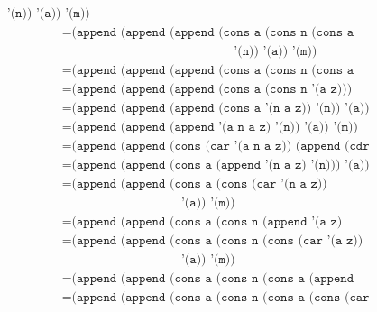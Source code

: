 \documentclass[letterpaper,11pt]{article}
\begin{document}
\begin{enumerate}
\begin{enumerate}
\begin{align*}
            \; \; \; \; \; \; \; \; \; \; \; \; \; \; \; \; \; \; \; \; \; \; \;
            \; \; \; 
                                               \texttt{'(n)) '(a)) '(m))} \\
            &= \texttt{(append (append (append (cons a (cons n (cons a (append '() '(z)))))} \\
            & \; \; \; \; \; \; \; \; \; \; \; \; \; \; \; \; \; \; \; \; \; \; \;
            \; \; \; \; \; \; \; \; \; \; \; \; \; \; \; \; \; \; \; \; \; \; \;
            \; \; \; 
                                               \texttt{'(n)) '(a)) '(m))} \\
            &= \texttt{(append (append (append (cons a (cons n (cons a '(z)))) '(n)) '(a)) '(m))} \\
            &= \texttt{(append (append (append (cons a (cons n '(a z))) '(n)) '(a)) '(m))} \\
            &= \texttt{(append (append (append (cons a '(n a z)) '(n)) '(a)) '(m))} \\
            &= \texttt{(append (append (append '(a n a z) '(n)) '(a)) '(m))} \\
            &= \texttt{(append (append (cons (car '(a n a z)) (append (cdr '(a n a z)) '(n))) '(a)) '(m))} \\
            &= \texttt{(append (append (cons a (append '(n a z) '(n))) '(a)) '(m))} \\
            &= \texttt{(append (append (cons a (cons (car '(n a z)) (append (cdr '(n a z)) '(n))))} \\
            & \; \; \; \; \; \; \; \; \; \; \; \; \; \; \; \; \; \; \; \; \; \; \;
            \; \; \; \; \; \; \; \; \; \; \; 
                                       \texttt{'(a)) '(m))} \\
            &= \texttt{(append (append (cons a (cons n (append '(a z) '(n)))) '(a)) '(m))} \\
            &= \texttt{(append (append (cons a (cons n (cons (car '(a z)) (append (cdr '(a z)) '(n)))))} \\
            & \; \; \; \; \; \; \; \; \; \; \; \; \; \; \; \; \; \; \; \; \; \; \;
            \; \; \; \; \; \; \; \; \; \; \; 
                                       \texttt{'(a)) '(m))} \\
            &= \texttt{(append (append (cons a (cons n (cons a (append '(z) '(n))))) '(a)) '(m))} \\
            &= \texttt{(append (append (cons a (cons n (cons a (cons (car '(z)) (append (cdr '(z)) '(n))))))} \\

\end{align*}
\end{enumerate}
\end{enumerate}
\end{document}
